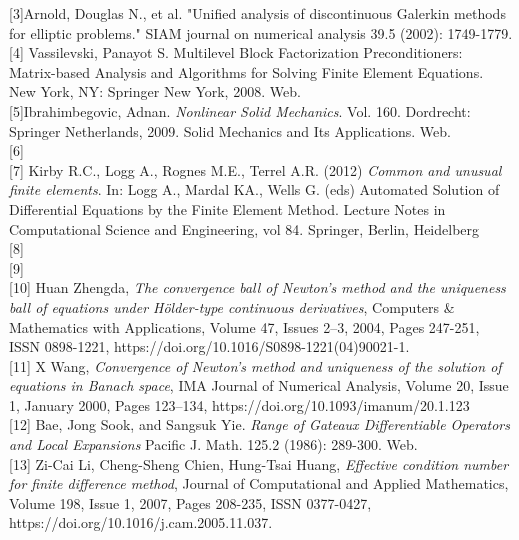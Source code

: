 \documentclass[11pt,twoside,a4paper]{article}
\begin{document}
[3]Arnold, Douglas N., et al. "Unified analysis of discontinuous Galerkin methods for elliptic problems." SIAM journal on numerical analysis 39.5 (2002): 1749-1779.\\

[4] Vassilevski, Panayot S. Multilevel Block Factorization Preconditioners: Matrix-based Analysis and Algorithms for Solving Finite Element Equations. New York, NY: Springer New York, 2008. Web.\\

[5]Ibrahimbegovic, Adnan. \textit{Nonlinear Solid Mechanics}. Vol. 160. Dordrecht: Springer Netherlands, 2009. Solid Mechanics and Its Applications. Web.\\

[6]\\

[7]  Kirby R.C., Logg A., Rognes M.E., Terrel A.R. (2012) \textit{Common and unusual finite elements}. In: Logg A., Mardal KA., Wells G. (eds) Automated Solution of Differential Equations by the Finite Element Method. Lecture Notes in Computational Science and Engineering, vol 84. Springer, Berlin, Heidelberg\\

[8]\\

[9]\\

[10] Huan Zhengda, \textit{The convergence ball of Newton's method and the uniqueness ball of equations under Hölder-type continuous derivatives},
Computers \& Mathematics with Applications,
Volume 47, Issues 2–3,
2004,
Pages 247-251,
ISSN 0898-1221,
https://doi.org/10.1016/S0898-1221(04)90021-1.\\

[11] X Wang, \textit{Convergence of Newton's method and uniqueness of the solution of equations in Banach space}, IMA Journal of Numerical Analysis, Volume 20, Issue 1, January 2000, Pages 123–134, https://doi.org/10.1093/imanum/20.1.123\\

[12] Bae, Jong Sook, and Sangsuk Yie. \textit{Range of Gateaux Differentiable Operators and Local Expansions}  Pacific J. Math. 125.2 (1986): 289-300. Web.\\

[13] Zi-Cai Li, Cheng-Sheng Chien, Hung-Tsai Huang,\textit{
Effective condition number for finite difference method},
Journal of Computational and Applied Mathematics,
Volume 198, Issue 1,
2007,
Pages 208-235,
ISSN 0377-0427,
https://doi.org/10.1016/j.cam.2005.11.037.\\
\end{document}
